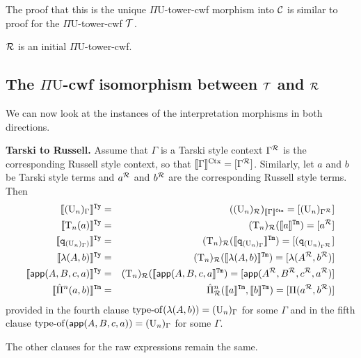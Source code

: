 \documentclass{lmcs}
\def\UU{\mathrm{U}}
\def\Ta{\mathrm{T}}
\def\Pihat{\hat{\Pi}}
\newcommand{\intCtxU}[1]{\llbracket #1 \rrbracket^\RawCtx}
\newcommand{\intTyU}[1]{\llbracket #1 \rrbracket^\RawTy}
\newcommand{\intTmU}[1]{\llbracket #1 \rrbracket^\RawTm}
\begin{document}
The proof that this is the unique $\Pi\UU$-tower-cwf morphism into ${\mathcal C}$ is similar to proof for the  $\Pi\UU$-tower-cwf ${\mathcal T}$.

\begin{thm}\label{theom:initial_cwf}
  $\mathcal{R}$ is an initial $\Pi\UU$-tower-cwf.
\end{thm}

\subsection{The $\Pi\UU$-cwf isomorphism between ${\mathcal T}$ and $\mathcal{R}$}
We can now look at the instances of the interpretation morphisms in both directions.

{\bf Tarski to Russell.} Assume that $\Gamma$ is a Tarski style context $\Gamma^{\mathcal{R}}$ is the corresponding Russell style context, so that $\llbracket \Gamma \rrbracket^{\mathrm{Ctx}} = [ \Gamma^{\mathcal{R}} ]$. Similarly, let $a$ and $b$ be Tarski style terms and $a^{\mathcal{R}}$ and $b^{\mathcal{R}}$ are the corresponding Russell style terms. Then
\begin{eqnarray*}
 \intTyU{(\UU_n)_\Gamma} &=& ((\UU_n)_\R)_{\intCtxU{\Gamma}}
 = [(\UU_n)_{\Gamma^\R}]\\
\intTyU{\Ta_n(a)} &=& (\Ta_n)_\R(\intTmU{a}) 
= [a^\R]\\
\intTyU{\qI_{(\UU_n)_\Gamma)}}&=& (\Ta_n)_\R(\intTmU{\qI_{(\UU_n)_\Gamma}}) = [ (\qI_{(\UU_n)_{\Gamma^\R}} ]\\
\intTyU{\lambda(A,b)}&=& (\Ta_n)_\R(\intTmU{\lambda(A,b)}) = [ \lambda(A^\R ,b^\R ) ]\\
\intTyU{\app(A,B,c,a)}&=& (\Ta_n)_\R(\intTmU{\app(A,B,c,a}) = [ \app(A^\R ,B^\R ,c^\R ,a^\R ) ]\\
\intTmU{\Pihat^n(a,b)}&=& \Pihat^n_\R(\intTmU{a},\intTmU{b})
= [\Pi(a^\R,b^\R)]
\end{eqnarray*}
provided in the fourth clause $\typeof(\lambda(A,b)) = (\UU_n)_\Gamma$ for some $\Gamma$ and in the fifth clause $\typeof(\app(A,B,c,a)) = (\UU_n)_\Gamma$ for some $\Gamma$.

The other clauses for the raw expressions remain the same.
\end{document}
